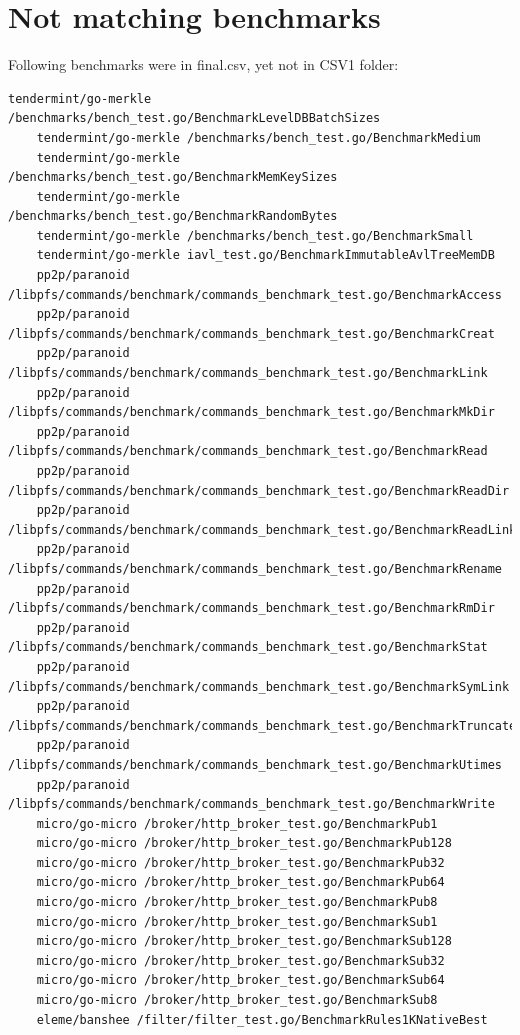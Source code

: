 \documentclass{seal_thesis}
\begin{document}
\section{Not matching benchmarks}
\label{infinalbutnotincsv1}
Following benchmarks were in final.csv, yet not in CSV1 folder:
\begin{lstlisting}[basicstyle=\tiny]
	tendermint/go-merkle /benchmarks/bench_test.go/BenchmarkLevelDBBatchSizes
	tendermint/go-merkle /benchmarks/bench_test.go/BenchmarkMedium
	tendermint/go-merkle /benchmarks/bench_test.go/BenchmarkMemKeySizes
	tendermint/go-merkle /benchmarks/bench_test.go/BenchmarkRandomBytes
	tendermint/go-merkle /benchmarks/bench_test.go/BenchmarkSmall
	tendermint/go-merkle iavl_test.go/BenchmarkImmutableAvlTreeMemDB
	pp2p/paranoid /libpfs/commands/benchmark/commands_benchmark_test.go/BenchmarkAccess
	pp2p/paranoid /libpfs/commands/benchmark/commands_benchmark_test.go/BenchmarkCreat
	pp2p/paranoid /libpfs/commands/benchmark/commands_benchmark_test.go/BenchmarkLink
	pp2p/paranoid /libpfs/commands/benchmark/commands_benchmark_test.go/BenchmarkMkDir
	pp2p/paranoid /libpfs/commands/benchmark/commands_benchmark_test.go/BenchmarkRead
	pp2p/paranoid /libpfs/commands/benchmark/commands_benchmark_test.go/BenchmarkReadDir
	pp2p/paranoid /libpfs/commands/benchmark/commands_benchmark_test.go/BenchmarkReadLink
	pp2p/paranoid /libpfs/commands/benchmark/commands_benchmark_test.go/BenchmarkRename
	pp2p/paranoid /libpfs/commands/benchmark/commands_benchmark_test.go/BenchmarkRmDir
	pp2p/paranoid /libpfs/commands/benchmark/commands_benchmark_test.go/BenchmarkStat
	pp2p/paranoid /libpfs/commands/benchmark/commands_benchmark_test.go/BenchmarkSymLink
	pp2p/paranoid /libpfs/commands/benchmark/commands_benchmark_test.go/BenchmarkTruncate
	pp2p/paranoid /libpfs/commands/benchmark/commands_benchmark_test.go/BenchmarkUtimes
	pp2p/paranoid /libpfs/commands/benchmark/commands_benchmark_test.go/BenchmarkWrite
	micro/go-micro /broker/http_broker_test.go/BenchmarkPub1
	micro/go-micro /broker/http_broker_test.go/BenchmarkPub128
	micro/go-micro /broker/http_broker_test.go/BenchmarkPub32
	micro/go-micro /broker/http_broker_test.go/BenchmarkPub64
	micro/go-micro /broker/http_broker_test.go/BenchmarkPub8
	micro/go-micro /broker/http_broker_test.go/BenchmarkSub1
	micro/go-micro /broker/http_broker_test.go/BenchmarkSub128
	micro/go-micro /broker/http_broker_test.go/BenchmarkSub32
	micro/go-micro /broker/http_broker_test.go/BenchmarkSub64
	micro/go-micro /broker/http_broker_test.go/BenchmarkSub8
	eleme/banshee /filter/filter_test.go/BenchmarkRules1KNativeBest

\end{lstlisting}
\end{document}

